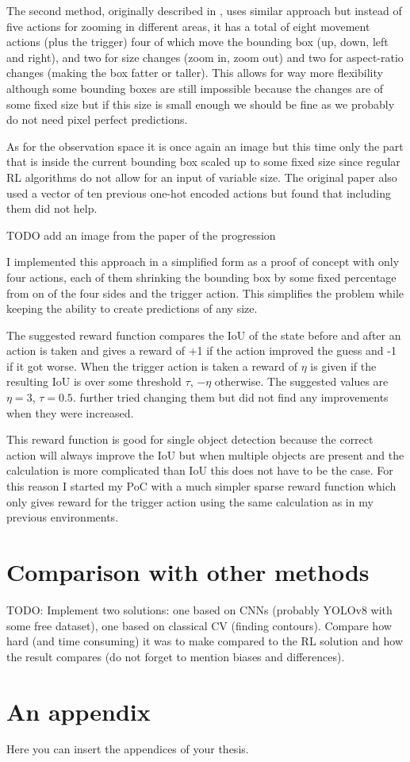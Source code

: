 \documentclass[
  digital,     %
  oneside,     %
  nosansbold,  %
  nocolorbold, %
  lof,         %
  lot,         %
]{fithesis4}
\begin{document}
The second method, originally described in \cite{iterative_od_with_rl}, uses similar approach but instead of five actions for zooming in different areas, it has a total of eight movement actions (plus the trigger) four of which move the bounding box (up, down, left and right), and two for size changes (zoom in, zoom out) and two for aspect-ratio changes (making the box fatter or taller). This allows for way more flexibility although some bounding boxes are still impossible because the changes are of some fixed size but if this size is small enough we should be fine as we probably do not need pixel perfect predictions.

As for the observation space it is once again an image but this time only the part that is inside the current bounding box scaled up to some fixed size since regular RL algorithms do not allow for an input of variable size. The original paper \cite{iterative_od_with_rl} also used a vector of ten previous one-hot encoded actions but \cite{rl_object_detection} found that including them did not help.

TODO add an image from the paper of the progression

I implemented this approach in a simplified form as a proof of concept with only four actions, each of them shrinking the bounding box by some fixed percentage from on of the four sides and the trigger action. This simplifies the problem while keeping the ability to create predictions of any size.

The suggested reward function compares the IoU of the state before and after an action is taken and gives a reward of +1 if the action improved the guess and -1 if it got worse. When the trigger action is taken a reward of $\eta$ is given if the resulting IoU is over some threshold $\tau$, $-\eta$ otherwise. The suggested values are $\eta=3$, $\tau=0.5$. \cite{rl_object_detection} further tried changing them but did not find any improvements when they were increased.

This reward function is good for single object detection because the correct action will always improve the IoU but when multiple objects are present and the calculation is more complicated than IoU this does not have to be the case. For this reason I started my PoC with a much simpler sparse reward function which only gives reward for the trigger action using the same calculation as in my previous environments.

\chapter{Comparison with other methods}
TODO: Implement two solutions: one based on CNNs (probably YOLOv8 with some free dataset), one based on classical CV (finding contours).
%
Compare how hard (and time consuming) it was to make compared to the RL solution and how the result compares (do not forget to mention biases and differences).


\printbibliography[heading=bibintoc] %


\appendix %
\chapter{An appendix}
Here you can insert the appendices of your thesis.
\end{document}
